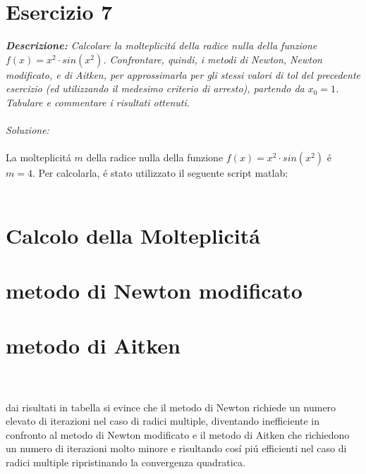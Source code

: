 \section{Esercizio 7}

\textit{\textbf{Descrizione:} Calcolare la molteplicit\'a della radice nulla della funzione $f(x) = x^{2} \cdot sin(x^{2})$. Confrontare, quindi, i metodi di Newton, Newton modificato, e di Aitken, per approssimarla per gli stessi valori di tol del precedente esercizio (ed utilizzando il medesimo criterio di arresto), partendo da $x_{0}=1$. Tabulare e commentare i risultati ottenuti.}\\~\\
\emph{Soluzione:}\\~\\
La molteplicit\'a $m$ della radice nulla della funzione $f(x) = x^{2} \cdot sin(x^{2})$  \'e $m=4$. Per calcolarla, \'e stato utilizzato il seguente script matlab:
\\~\\

\section*{Calcolo della Molteplicit\'a}

\newpage

\section*{metodo di  Newton modificato}

\newpage

\section*{metodo di Aitken}

\newpage

\\~\\
dai risultati in tabella si evince che il metodo di Newton richiede un numero elevato di iterazioni nel caso di radici multiple, diventando inefficiente in confronto al metodo di Newton modificato e il metodo di Aitken che richiedono un numero di iterazioni molto minore e risultando cos\'i pi\'u efficienti nel caso di radici multiple ripristinando la convergenza quadratica.